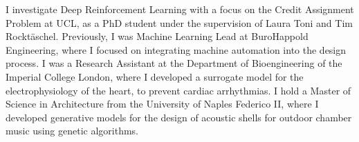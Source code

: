 I investigate Deep Reinforcement Learning with a focus on the Credit Assignment Problem at UCL, as a PhD student under the supervision of Laura Toni and Tim Rocktäschel.
Previously, I was Machine Learning Lead at BuroHappold Engineering, where I focused on integrating machine automation into the design process.
I was a Research Assistant at the Department of Bioengineering of the Imperial College London, where I developed a surrogate model for the electrophysiology of the heart, to prevent cardiac arrhythmias.
I hold a Master of Science in Architecture from the University of Naples Federico II, where I developed generative models for the design of acoustic shells for outdoor chamber music using genetic algorithms.